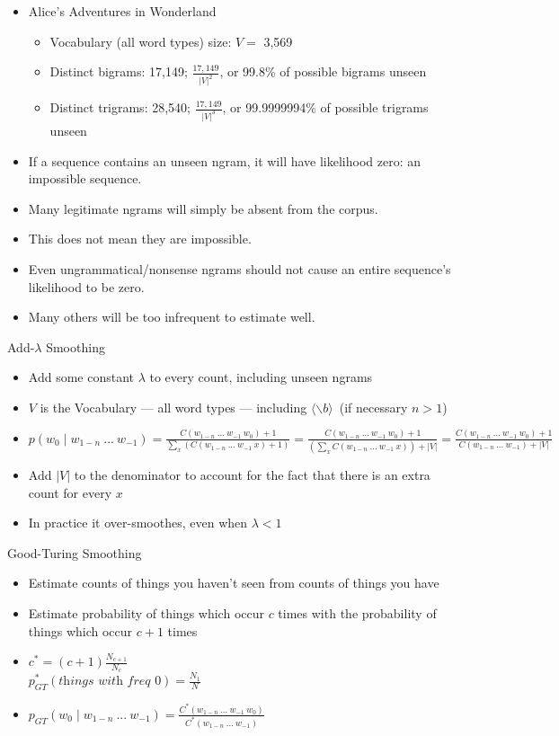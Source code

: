 \documentclass[11pt,letterpaper]{article}
\newcommand{\ngramend}{\ensuremath{\langle \backslash b \rangle}}
\begin{document}
\begin{itemize}
  \item Alice's Adventures in Wonderland
    \begin{itemize}
      \item Vocabulary (all word types) size: $V=$ 3,569
      \item Distinct bigrams:  17,149; $\frac{17,149}{|V|^2}$, or 99.8\% of possible bigrams unseen
      \item Distinct trigrams: 28,540; $\frac{17,149}{|V|^3}$, or 99.9999994\% of possible trigrams unseen
    \end{itemize}
  \item If a sequence contains an unseen ngram, it will have likelihood zero: an impossible sequence.
  \item Many legitimate ngrams will simply be absent from the corpus.
  \item This does not mean they are impossible.
  \item Even ungrammatical/nonsense ngrams should not cause an entire sequence's likelihood to be zero.
  \item Many others will be too infrequent to estimate well.
\end{itemize}


Add-$\lambda$ Smoothing

\begin{itemize}
  \item Add some constant $\lambda$ to every count, including unseen ngrams
  \item $V$ is the Vocabulary --- all word types --- including \ngramend\ (if necessary $n>1$)
  \item $p(w_0 \mid w_{1-n}~...~w_{-1}) = 
         \frac{C(w_{1-n}~...~w_{-1}~w_0)+1}{\sum_x (C(w_{1-n}~...~w_{-1}~x) + 1)} =
         \frac{C(w_{1-n}~...~w_{-1}~w_0)+1}{(\sum_x C(w_{1-n}~...~w_{-1}~x))+|V|} =
         \frac{C(w_{1-n}~...~w_{-1}~w_0)+1}{C(w_{1-n}~...~w_{-1})+|V|}$
  \item Add $|V|$ to the denominator to account for the fact that there is an extra count for every $x$
  \item In practice it over-smoothes, even when $\lambda < 1$
\end{itemize}


Good-Turing Smoothing

\begin{itemize}
  \item Estimate counts of things you haven't seen from counts of things you have
  \item Estimate probability of things which occur $c$ times with the probability of things which occur $c+1$ times
  \item $c^* = (c+1) \frac{N_{c+1}}{N_c}$ \vspace{2mm} \\
        $p^*_{GT}(\textit{things with freq 0}) = \frac{N_1}{N}$
  \item $p_{GT}(w_0 \mid w_{1-n}~...~w_{-1}) = 
         \frac{C^*(w_{1-n}~...~w_{-1}~w_0)}{C^*(w_{1-n}~...~w_{-1})}$
\end{itemize}
\end{document}
